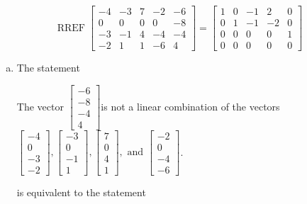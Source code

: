 \begin{exerciseAnswer} 
\[\operatorname{RREF}  \left[\begin{array}{cccc|c}
-4 & -3 & 7 & -2 & -6 \\
0 & 0 & 0 & 0 & -8 \\
-3 & -1 & 4 & -4 & -4 \\
-2 & 1 & 1 & -6 & 4
\end{array}\right] = \left[\begin{array}{cccc|c}
1 & 0 & -1 & 2 & 0 \\
0 & 1 & -1 & -2 & 0 \\
0 & 0 & 0 & 0 & 1 \\
0 & 0 & 0 & 0 & 0
\end{array}\right] \]
\begin{enumerate}[(a)]
\item  The statement 
\begin{center}\begin{minipage}{0.8\textwidth}
 The vector \( \left[\begin{array}{c}
-6 \\
-8 \\
-4 \\
4
\end{array}\right] \)is not a linear combination of the vectors \( \left[\begin{array}{c}
-4 \\
0 \\
-3 \\
-2
\end{array}\right] , \left[\begin{array}{c}
-3 \\
0 \\
-1 \\
1
\end{array}\right] , \left[\begin{array}{c}
7 \\
0 \\
4 \\
1
\end{array}\right] , \text{ and } \left[\begin{array}{c}
-2 \\
0 \\
-4 \\
-6
\end{array}\right] \). 
\end{minipage}\end{center}
     is equivalent to the statement 
\begin{center}\begin{minipage}{0.8\textwidth}

\end{minipage}
\end{center}
\end{enumerate}
\end{exerciseAnswer}
